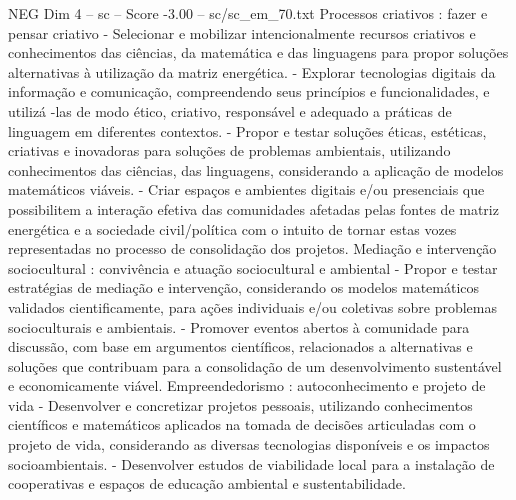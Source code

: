 \begin{textsample}{NEG Dim 4 – sc – Score -3.00 – sc/sc\_em\_70.txt}
Processos criativos : fazer e pensar criativo - Selecionar e mobilizar intencionalmente recursos criativos e conhecimentos das ciências, da matemática e das linguagens para propor soluções alternativas à utilização da matriz energética. - Explorar tecnologias digitais da informação e comunicação, compreendendo seus princípios e funcionalidades, e utilizá -las de modo ético, criativo, responsável e adequado a práticas de linguagem em diferentes contextos. - Propor e testar soluções éticas, estéticas, criativas e inovadoras para soluções de problemas ambientais, utilizando conhecimentos das ciências, das linguagens, considerando a aplicação de modelos matemáticos viáveis. - Criar espaços e ambientes digitais e/ou presenciais que possibilitem a interação efetiva das comunidades afetadas pelas fontes de matriz energética e a sociedade civil/política com o intuito de tornar estas vozes representadas no processo de consolidação dos projetos.
Mediação e intervenção sociocultural : convivência e atuação sociocultural e ambiental - Propor e testar estratégias de mediação e intervenção, considerando os modelos matemáticos validados cientificamente, para ações individuais e/ou coletivas sobre problemas socioculturais e ambientais. - Promover eventos abertos à comunidade para discussão, com base em argumentos científicos, relacionados a alternativas e soluções que contribuam para a consolidação de um desenvolvimento sustentável e economicamente viável.
Empreendedorismo : autoconhecimento e projeto de vida - Desenvolver e concretizar projetos pessoais, utilizando conhecimentos científicos e matemáticos aplicados na tomada de decisões articuladas com o projeto de vida, considerando as diversas tecnologias disponíveis e os impactos socioambientais. - Desenvolver estudos de viabilidade local para a instalação de cooperativas e espaços de educação ambiental e sustentabilidade.

\end{textsample}
